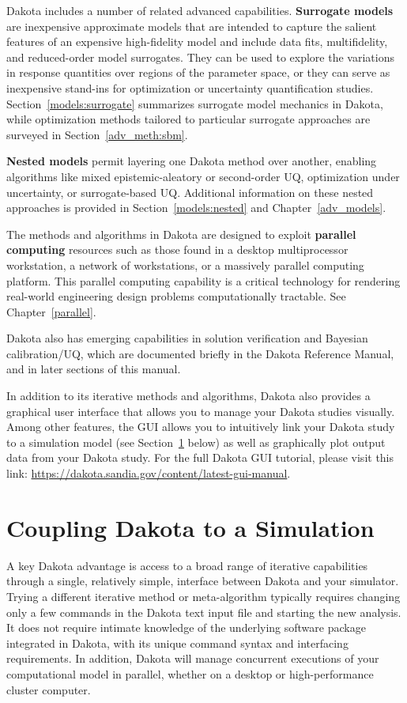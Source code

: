 Dakota includes a number of related advanced capabilities. {\bf
  Surrogate models} are inexpensive approximate models that are
intended to capture the salient features of an expensive high-fidelity
model and include data fits, multifidelity, and reduced-order model
surrogates. They can be used to explore the variations in response
quantities over regions of the parameter space, or they can serve as
inexpensive stand-ins for optimization or uncertainty quantification
studies. Section~\ref{models:surrogate} summarizes surrogate model
mechanics in Dakota, while optimization methods tailored to particular
surrogate approaches are surveyed in Section~\ref{adv_meth:sbm}.

{\bf Nested models} permit layering one Dakota method over another,
enabling algorithms like mixed epistemic-aleatory or second-order UQ,
optimization under uncertainty, or surrogate-based UQ. Additional
information on these nested approaches is provided in
Section~\ref{models:nested} and Chapter~\ref{adv_models}.

The methods and algorithms in Dakota are designed to exploit {\bf
  parallel computing} resources such as those found in a desktop
multiprocessor workstation, a network of workstations, or a massively
parallel computing platform. This parallel computing capability is a
critical technology for rendering real-world engineering design
problems computationally tractable. See Chapter~\ref{parallel}.

Dakota also has emerging capabilities in solution verification and
Bayesian calibration/UQ, which are documented briefly in the Dakota
Reference Manual, and in later sections of this manual.

In addition to its iterative methods and algorithms, Dakota also 
provides a graphical user interface that allows you to manage your 
Dakota studies visually.  Among other features, the GUI allows you 
to intuitively link your Dakota study to a simulation model (see 
Section~\ref{intro:coupling} below) as well as graphically plot 
output data from your Dakota study.  For the full Dakota GUI tutorial, 
please visit this link:  
\url{https://dakota.sandia.gov/content/latest-gui-manual}.

\section{Coupling Dakota to a Simulation}\label{intro:coupling}

A key Dakota advantage is access to a broad range of iterative
capabilities through a single, relatively simple, interface between Dakota
and your simulator. Trying a different iterative method or meta-algorithm
typically requires changing only a few commands in the Dakota text
input file and starting the new analysis. It does not require intimate
knowledge of the underlying software package integrated in Dakota, with
its unique command syntax and interfacing requirements.  In addition,
Dakota will manage concurrent executions of your computational model in
parallel, whether on a desktop or high-performance cluster computer.


